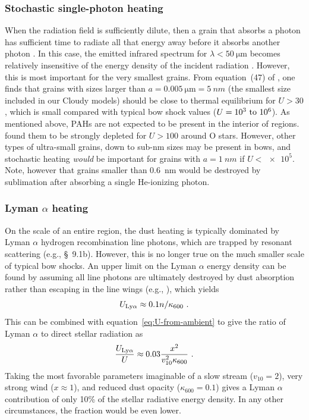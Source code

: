 \subsubsection{Stochastic single-photon heating}

When the radiation field is sufficiently dilute, then a grain that
absorbs a photon has sufficient time to radiate all that energy away
before it absorbs another photon \citep{Duley:1973a}.  In this case,
the emitted infrared spectrum for \(\lambda < \SI{50}{\um}\) becomes
relatively insensitive of the energy density of the incident radiation
\citep{Draine:2001a}.  However, this is most important for the very
smallest grains.  From equation~(47) of \citet{Draine:2001a}, one
finds that grains with sizes larger than
\(a = \SI{0.005}{\um} = \SI{5}{nm}\) (the smallest size included in
our Cloudy models) should be close to thermal equilibrium for
\(U > 30\), which is small compared with typical bow shock values
(\(U = \text{\numrange{e3}{e6}}\)).  As mentioned above, PAHs are not
expected to be present in the interior of \hii{} regions.
\citealp{Desert:1990a} found them to be strongly depleted for
\(U > 100\) around O stars.  However, other types of ultra-small
grains, down to sub-nm sizes \citep{Xie:2018a} may be present in bows,
and stochastic heating \emph{would} be important for grains with
\(a = \SI{1}{nm}\) if \(U < \num{e5}\).  Note, however that grains
smaller than \SI{0.6}{nm} would be destroyed by sublimation after
absorbing a single He-ionizing photon.


\subsubsection{Lyman \(\alpha\) heating}

On the scale of an entire \hii{} region, the dust heating is typically
dominated by Lyman \(\alpha\) hydrogen recombination line photons, which
are trapped by resonant scattering (e.g., \citealp{Spitzer:1978a}
\S~9.1b).  However, this is no longer true on the much smaller scale
of typical bow shocks.  An upper limit on the Lyman \(\alpha\) energy
density can be found by assuming all line photons are ultimately
destroyed by dust absorption rather than escaping in the line wings
(e.g., \citealp{Henney:1998b}), which yields
\begin{equation}
  \label{eq:U-Lya}
  U_{\text{Ly}\alpha} \approx 0.1 n / \kappa_{600} \ .
\end{equation}
This can be combined with equation~\eqref{eq:U-from-ambient} to give
the ratio of Lyman \(\alpha\) to direct stellar radiation as
\begin{equation}
  \label{eq:Lya-over-stellar}
  \frac{U\Lya}{U} \approx 0.03 \frac{x^2}{v_{10}^2 \kappa_{600}} \ .
\end{equation}
Taking the most favorable parameters imaginable of a slow stream
(\(v_{10} = 2\)), very strong wind (\(x \approx 1\)), and reduced dust
opacity (\(\kappa_{600} = 0.1\)) gives a Lyman \(\alpha\) contribution of only
10\% of the stellar radiative energy density.  In any other
circumstances, the fraction would be even lower.

